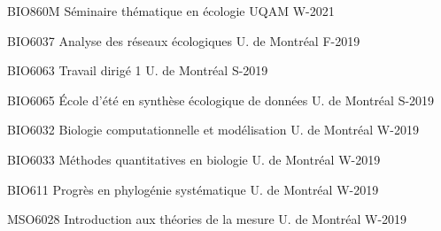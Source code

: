 


\begin{cvhonors}

  \cvhonor
    {BIO860M} %
    {Séminaire thématique en écologie} %
    {UQAM} %
    {W-2021} %
    
  \cvhonor
    {BIO6037} %
    {Analyse des réseaux écologiques} %
    {U. de Montréal} %
    {F-2019} %

  \cvhonor
    {BIO6063} %
    {Travail dirigé 1} %
    {U. de Montréal} %
    {S-2019} %

  \cvhonor
    {BIO6065} %
    {École d’été en synthèse écologique de données} %
    {U. de Montréal} %
    {S-2019} %
    
  \cvhonor
    {BIO6032} %
    {Biologie computationnelle et modélisation} %
    {U. de Montréal} %
    {W-2019} %

  \cvhonor
    {BIO6033} %
    {Méthodes quantitatives en biologie} %
    {U. de Montréal} %
    {W-2019} %

  \cvhonor
    {BIO611} %
    {Progrès en phylogénie systématique} %
    {U. de Montréal} %
    {W-2019} %

  \cvhonor
    {MSO6028} %
    {Introduction aux théories de la mesure} %
    {U. de Montréal} %
    {W-2019} %
    

\end{cvhonors}
